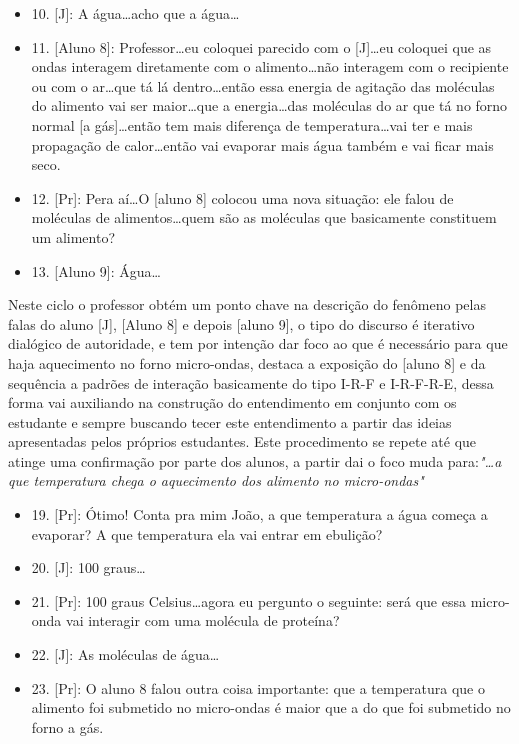 \begin{itemize}
    \item 10. [J]: A água\ldots acho que a água\ldots
    \item 11. [Aluno 8]: Professor\ldots eu coloquei parecido com o [J]\ldots eu coloquei que as ondas interagem diretamente com o alimento\ldots não interagem com o recipiente ou com o ar\ldots que tá lá dentro\ldots então essa energia de agitação das moléculas do alimento vai ser maior\ldots que a energia\ldots das moléculas do ar que tá no forno normal [a gás]\ldots então tem mais diferença de temperatura\ldots vai ter e mais propagação de calor\ldots então vai evaporar mais água também e vai ficar mais seco.
    \item 12. [Pr]: Pera aí\ldots O [aluno 8] colocou uma nova situação: ele falou de moléculas de alimentos\ldots quem são as moléculas que basicamente constituem um alimento?
    \item 13. [Aluno 9]: Água\ldots
\end{itemize}
Neste ciclo o professor obtém um ponto chave na descrição do fenômeno pelas falas do aluno [J], [Aluno 8] e depois [aluno 9], o tipo do discurso é iterativo dialógico de autoridade, e tem por intenção dar foco ao que é necessário para que haja aquecimento no forno micro-ondas, destaca a exposição do [aluno 8] e da sequência a padrões de interação basicamente do tipo I-R-F e I-R-F-R-E, dessa forma vai auxiliando na construção do entendimento em conjunto com os estudante e sempre buscando tecer este entendimento a partir das ideias apresentadas pelos próprios estudantes.
Este procedimento se repete até que atinge uma confirmação por parte dos alunos, a partir dai o foco muda para:\emph{"\ldots a que temperatura chega o aquecimento dos alimento no micro-ondas"}
\begin{itemize}
    \item 19. [Pr]: Ótimo! Conta pra mim João, a que temperatura a água começa a evaporar? A que temperatura ela vai entrar em ebulição?
    \item 20. [J]: 100 graus\ldots
    \item 21. [Pr]: 100 graus Celsius\ldots agora eu pergunto o seguinte: será que essa micro-onda vai interagir com uma molécula de proteína?
    \item 22. [J]: As moléculas de água\ldots
    \item 23. [Pr]: O aluno 8 falou outra coisa importante: que a temperatura que o alimento foi submetido no micro-ondas é maior que a do que foi submetido no forno a gás.
\end{itemize}
